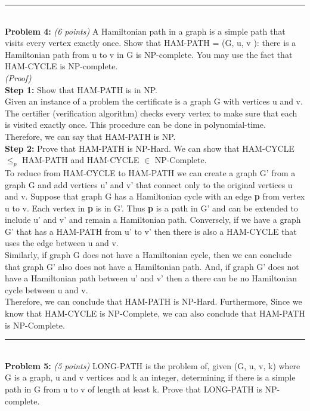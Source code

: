 \documentclass{article}
\begin{document}
\noindent\rule{8cm}{0.4pt}
\\[.25cm]

\noindent \textbf{Problem 4:} \textit{(6 points)} A Hamiltonian path in a graph is a simple path that visits every vertex exactly once. Show that HAM-PATH = { (G, u, v ): there is a Hamiltonian path from u to v in G} is NP-complete. You may use the fact that HAM-CYCLE is NP-complete.
\\[.25cm]
\textit{(Proof)}
\\[.25cm]
\textbf{Step 1: }Show that HAM-PATH is in NP.
\\[.25cm]
Given an instance of a problem the certificate is a graph G with vertices u and v. The certifier (verification algorithm) checks every vertex to make sure that each is visited exactly once. This procedure can be done in polynomial-time. Therefore, we can say that HAM-PATH is NP.
\\[.25cm]
\textbf{Step 2: }Prove that HAM-PATH is NP-Hard. We can show that HAM-CYCLE $\leq _p$ HAM-PATH and HAM-CYCLE $\in$ NP-Complete. 
\\[.25cm]
To reduce from HAM-CYCLE to HAM-PATH we can create a graph G' from a graph G and add vertices u' and v' that connect only to the original vertices u and v. Suppose that graph G has a Hamiltonian cycle with an edge \textbf{p} from vertex u to v. Each vertex in \textbf{p} is in G'. Thus \textbf{p} is a path in G' and can be extended to include u' and v' and remain a Hamiltonian path. Conversely, if we have a graph G' that has a HAM-PATH from u' to v' then there is also a HAM-CYCLE that uses the edge between u and v.\\

Similarly, if graph G does not have a Hamiltonian cycle, then we can conclude that graph G' also does not have a Hamiltonian path. And, if graph G' does not have a Hamiltonian path between u' and v' then a there can be no Hamiltonian cycle between u and v.\\

Therefore, we can conclude that HAM-PATH is NP-Hard. Furthermore, Since we know that HAM-CYCLE is NP-Complete, we  can also conclude that HAM-PATH is NP-Complete. 
\\[.25cm]

\noindent\rule{8cm}{0.4pt}
\\[.25cm]


\noindent \textbf{Problem 5:} \textit{(5 points)} LONG-PATH is the problem of, given (G, u, v, k) where G is a graph, u and v vertices and k an integer, determining if there is a simple path in G from u to v of length at least k. Prove that LONG-PATH is NP-complete.
\\[.25cm]
\end{document}
